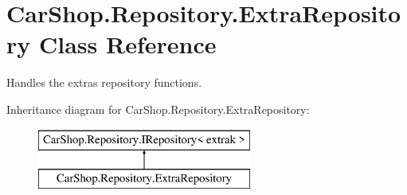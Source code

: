 \hypertarget{class_car_shop_1_1_repository_1_1_extra_repository}{}\section{Car\+Shop.\+Repository.\+Extra\+Repository Class Reference}
\label{class_car_shop_1_1_repository_1_1_extra_repository}


Handles the extra\textquotesingle{}s repository functions.  


Inheritance diagram for Car\+Shop.\+Repository.\+Extra\+Repository\+:\begin{figure}[H]
\begin{center}
\leavevmode
\includegraphics[height=2.000000cm]{class_car_shop_1_1_repository_1_1_extra_repository}
\end{center}
\end{figure}
